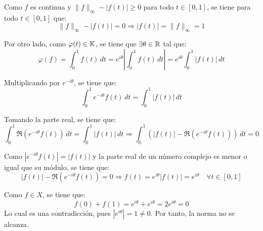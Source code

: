 \documentclass[12pt]{article}
\begin{document}
\begin{ejercicio}[2.5 puntos]
    Como $f$ es continua y $\|f\|_\infty - |f(t)| \geq 0$ para todo $t \in [0, 1]$, se tiene para todo $t \in [0, 1]$ que:
    \begin{equation*}
        \|f\|_\infty - |f(t)| = 0 \Longrightarrow |f(t)| = \|f\|_\infty = 1
    \end{equation*}

    Por otro lado, como $\varphi(t)\in \mathbb{K}$, se tiene que $\exists \theta \in \mathbb{R}$ tal que:
    \begin{equation*}
        \varphi(f) = \int_{0}^{1} f(t)\,dt = e^{i\theta} \left|\int_{0}^{1} f(t)\,dt\right| = e^{i\theta} \int_{0}^{1} |f(t)|\,dt
    \end{equation*}

    Multiplicando por $e^{-i\theta}$, se tiene que:
    \begin{equation*}
        \int_{0}^{1} e^{-i\theta} f(t)\,dt = \int_{0}^{1} |f(t)|\,dt
    \end{equation*}

    Tomando la parte real, se tiene que:
    \begin{equation*}
        \int_{0}^{1} \Re\left(e^{-i\theta} f(t)\right)\,dt = \int_{0}^{1} |f(t)|\,dt
        \Longrightarrow
        \int_{0}^{1} \left(|f(t)| - \Re\left(e^{-i\theta} f(t)\right)\right)\,dt = 0
    \end{equation*}

    Como $|e^{-i\theta} f(t)| = |f(t)|$ y la parte real de un número complejo es menor o igual que su módulo, se tiene que:
    \begin{equation*}
        |f(t)| - \Re\left(e^{-i\theta} f(t)\right) = 0 \Longrightarrow f(t) = e^{i\theta} |f(t)|= e^{i\theta} \quad \forall t \in [0, 1]
    \end{equation*}
    
    Como $f \in X$, se tiene que:
    \begin{equation*}
        f(0) + f(1) = e^{i\theta} + e^{i\theta} = 2 e^{i\theta} = 0
    \end{equation*}
    Lo cual es una contradicción, pues $|e^{i\theta}| = 1 \neq 0$. Por tanto, la norma no se alcanza.
\end{ejercicio}
\end{document}
